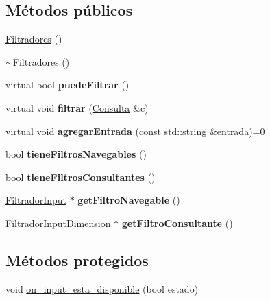 \subsection*{\-Métodos públicos}
\begin{DoxyCompactItemize}
\item 
\hyperlink{classFiltradores_a3d450f3b376ff71acb8c06d7be7bf49b}{\-Filtradores} ()
\item 
\hyperlink{classFiltradores_a6d9df7e673dd658d851cb6e809ba472f}{$\sim$\-Filtradores} ()
\item 
\hypertarget{classFiltradores_a62f207dc95b9bfdfd2e4250c82c160f3}{virtual bool {\bfseries puede\-Filtrar} ()}\label{classFiltradores_a62f207dc95b9bfdfd2e4250c82c160f3}

\item 
\hypertarget{classFiltradores_a28e80978bb0e2e03adebae297b76a309}{virtual void {\bfseries filtrar} (\hyperlink{classConsulta}{\-Consulta} \&c)}\label{classFiltradores_a28e80978bb0e2e03adebae297b76a309}

\item 
\hypertarget{classFiltradores_a84dc1b94f28a2965e90b36bc149ab164}{virtual void {\bfseries agregar\-Entrada} (const std\-::string \&entrada)=0}\label{classFiltradores_a84dc1b94f28a2965e90b36bc149ab164}

\item 
\hypertarget{classFiltradores_ad302fc3bea625acdd3f623afbcc8a030}{bool {\bfseries tiene\-Filtros\-Navegables} ()}\label{classFiltradores_ad302fc3bea625acdd3f623afbcc8a030}

\item 
\hypertarget{classFiltradores_a5d4e09183a8858e6fd410202cbf9ace4}{bool {\bfseries tiene\-Filtros\-Consultantes} ()}\label{classFiltradores_a5d4e09183a8858e6fd410202cbf9ace4}

\item 
\hypertarget{classFiltradores_a538fe2160d8d3037563603c47e9566f2}{\hyperlink{classFiltradorInput}{\-Filtrador\-Input} $\ast$ {\bfseries get\-Filtro\-Navegable} ()}\label{classFiltradores_a538fe2160d8d3037563603c47e9566f2}

\item 
\hypertarget{classFiltradores_a6d64cad1b899951c50ac42cbaf49921f}{\hyperlink{classFiltradorInputDimension}{\-Filtrador\-Input\-Dimension} $\ast$ {\bfseries get\-Filtro\-Consultante} ()}\label{classFiltradores_a6d64cad1b899951c50ac42cbaf49921f}

\end{DoxyCompactItemize}
\subsection*{\-Métodos protegidos}
\begin{DoxyCompactItemize}
\item 
void \hyperlink{classFiltradores_a53e6d4e610239dc8890853ac0ac647a6}{on\-\_\-input\-\_\-esta\-\_\-disponible} (bool estado)
\end{DoxyCompactItemize}
